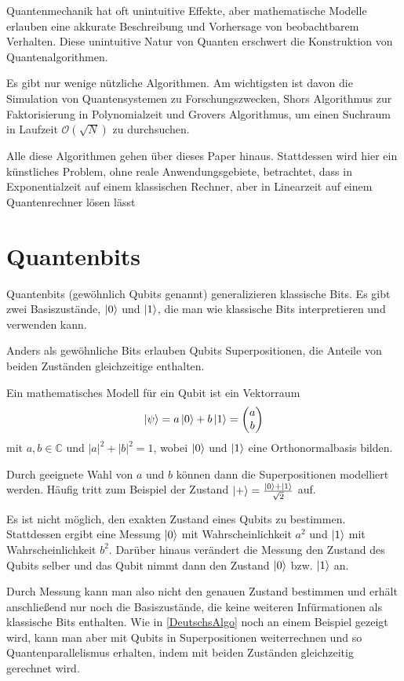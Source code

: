 \documentclass{acm_proc_article-sp}
\begin{document}
Quantenmechanik hat oft unintuitive Effekte, aber mathematische Modelle erlauben
eine akkurate Beschreibung und Vorhersage von beobachtbarem Verhalten.
Diese unintuitive Natur von Quanten erschwert die Konstruktion von Quantenalgorithmen.

Es gibt nur wenige nützliche Algorithmen. Am wichtigsten ist davon die Simulation von Quantensystemen zu
Forschungszwecken, Shors Algorithmus zur Faktorisierung in Polynomialzeit und Grovers Algorithmus, um
einen Suchraum in Laufzeit $\mathcal{O}(\sqrt N)$ zu durchsuchen.

Alle diese Algorithmen gehen über dieses Paper hinaus. Stattdessen wird hier ein künstliches Problem, ohne
reale Anwendungsgebiete, betrachtet, dass in Exponentialzeit auf einem klassischen Rechner, aber
in Linearzeit auf einem Quantenrechner lösen lässt

\section{Quantenbits}

Quantenbits (gewöhnlich Qubits genannt) generalizieren klassische Bits.
Es gibt zwei Basiszustände, $\left|0\right\rangle$ und $\left|1\right\rangle$, die man wie klassische Bits interpretieren und verwenden kann.

Anders als gewöhnliche Bits erlauben Qubits Superpositionen, die Anteile von beiden Zuständen gleichzeitige enthalten.

Ein mathematisches Modell für ein Qubit ist ein Vektorraum
    \[\left|\psi\right\rangle = a \left|0\right\rangle + b \left|1\right\rangle =
    \begin{pmatrix}
        a \\ b
    \end{pmatrix}
    \]
mit  \(a, b \in \mathbb C \) und $|a|^2 + |b|^2 = 1$, wobei $\left|0\right\rangle$ und $\left|1\right\rangle$ eine Orthonormalbasis bilden.

Durch geeignete Wahl von $a$ und $b$ können dann die Superpositionen modelliert werden.
Häufig tritt zum Beispiel der Zustand $\left|+\right\rangle = \frac{\left|0\right\rangle + \left|1\right\rangle}{\sqrt 2}$ auf.

Es ist nicht möglich, den exakten Zustand eines Qubits zu bestimmen.
Stattdessen ergibt eine Messung $\left|0\right\rangle$ mit Wahrscheinlichkeit $a^2$ und
$\left|1\right\rangle$ mit Wahrscheinlichkeit $b^2$.
Darüber hinaus verändert die Messung den Zustand des Qubits selber und
das Qubit nimmt dann den Zustand $\left|0\right\rangle$ bzw. $\left|1\right\rangle$ an.

Durch Messung kann man also nicht den genauen Zustand bestimmen und erhält anschließend nur noch die Basiszustände,
die keine weiteren Infürmationen als klassische Bits enthalten.
Wie in \ref{DeutschsAlgo} noch an einem Beispiel gezeigt wird, kann man aber mit Qubits in Superpositionen
weiterrechnen und so Quantenparallelismus erhalten, indem mit beiden Zuständen gleichzeitig gerechnet wird.
\end{document}
